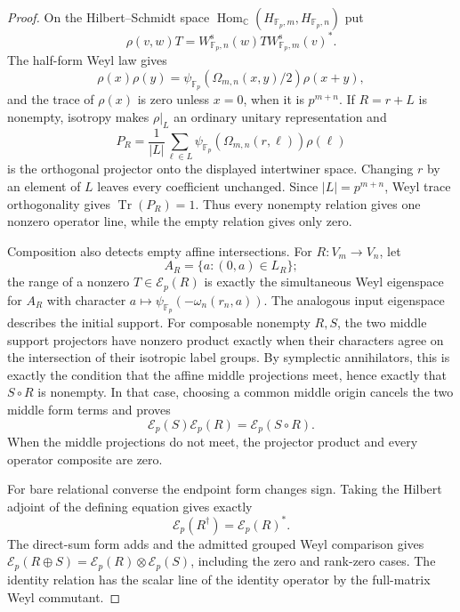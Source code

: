 \begin{proof}
On the Hilbert--Schmidt space
$\operatorname{Hom}_{\mathbb C}(H_{\mathbb F_p,m},H_{\mathbb F_p,n})$
put
\[
 \rho(v,w)T=W^{\mathrm s}_{\mathbb F_p,n}(w)T
 W^{\mathrm s}_{\mathbb F_p,m}(v)^*.
\]
The half-form Weyl law gives
\[
 \rho(x)\rho(y)=\psi_{\mathbb F_p}
   (\Omega_{m,n}(x,y)/2)\rho(x+y),
\]
and the trace of $\rho(x)$ is zero unless $x=0$, when it is
$p^{m+n}$.  If $R=r+L$ is nonempty, isotropy makes $\rho|_L$ an ordinary
unitary representation and
\[
 P_R=\frac1{|L|}\sum_{\ell\in L}
 \psi_{\mathbb F_p}(\Omega_{m,n}(r,\ell))\rho(\ell)
\]
is the orthogonal projector onto the displayed intertwiner space.  Changing
$r$ by an element of $L$ leaves every coefficient unchanged.  Since
$|L|=p^{m+n}$, Weyl trace orthogonality gives
$\operatorname{Tr}(P_R)=1$.  Thus every nonempty relation gives one nonzero
operator line, while the empty relation gives only zero.

Composition also detects empty affine intersections.  For
$R:V_m\to V_n$, let
\[
 A_R=\{a:(0,a)\in L_R\};
\]
the range of a nonzero $T\in\mathcal E_p(R)$ is exactly the simultaneous
Weyl eigenspace for $A_R$ with character
$a\mapsto\psi_{\mathbb F_p}(-\omega_n(r_n,a))$.  The analogous input
eigenspace describes the initial support.  For composable nonempty $R,S$,
the two middle support projectors have nonzero product exactly when their
characters agree on the intersection of their isotropic label groups.  By
symplectic annihilators, this is exactly the condition that the affine middle
projections meet, hence exactly that $S\circ R$ is nonempty.  In that case,
choosing a common middle origin cancels the two middle form terms and proves
\[
 \mathcal E_p(S)\mathcal E_p(R)=\mathcal E_p(S\circ R).
\]
When the middle projections do not meet, the projector product and every
operator composite are zero.

For bare relational converse the endpoint form changes sign.  Taking the
Hilbert adjoint of the defining equation gives exactly
\[
 \mathcal E_p(R^\dagger)=\mathcal E_p(R)^*.
\]
The direct-sum form adds and the admitted grouped Weyl comparison gives
$\mathcal E_p(R\oplus S)=\mathcal E_p(R)\otimes\mathcal E_p(S)$, including
the zero and rank-zero cases.  The identity relation has the scalar line of
the identity operator by the full-matrix Weyl commutant.


\end{proof}
